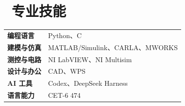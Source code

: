 \documentclass[11pt]{article}
\begin{document}
\section{\makebox[\widthof{\faCogs}][c]{\color{CVBlue}\faCogs}\ 专业技能}
\renewcommand{\arraystretch}{1.10}
\begin{tabular}{@{}p{2.6cm}p{14.7cm}@{}}
    \textbf{编程语言} & Python、C \\
    \textbf{建模与仿真} & MATLAB/Simulink、CARLA、MWORKS \\
    \textbf{测控与电路} & NI LabVIEW、NI Multisim \\
    \textbf{设计与办公} & CAD、WPS \\
    \textbf{AI 工具} & Codex、DeepSeek Harness \\
    \textbf{语言能力} & CET-6 474 \\
\end{tabular}
\end{document}
